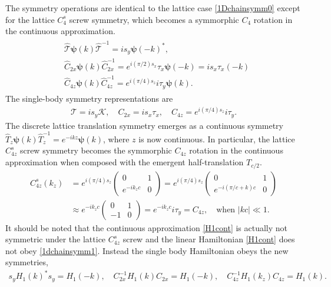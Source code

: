 The symmetry operations are identical to the lattice case \eqref{1Dchainsymm0} except for the lattice $C_4^s$ screw symmetry, which becomes a symmorphic $C_4$ rotation in the continuous approximation. \begin{align}\begin{split}&\hat{\mathcal{T}}\boldsymbol\psi(k)\hat{\mathcal{T}}^{-1}=is_y\boldsymbol\psi(-k)^\ast,\\&\hat{C}_{2x}\boldsymbol\psi(k)\hat{C}_{2x}^{-1}=e^{i(\pi/2)s_x}\tau_x\boldsymbol\psi(-k)=is_x\tau_x(-k)\\&\hat{C}_{4z}\boldsymbol\psi(k)\hat{C}_{4z}^{-1}=e^{i(\pi/4)s_z}i\tau_y\boldsymbol\psi(k).\end{split}\end{align} The single-body symmetry representations are \begin{align}\mathcal{T}=is_y\mathcal{K},\quad C_{2x}=is_x\tau_x,\quad C_{4z}=e^{i(\pi/4)s_z}i\tau_y.\end{align} The discrete lattice translation symmetry emerges as a continuous symmetry $\hat{T}_z\boldsymbol\psi(k)\hat{T}_z^{-1}=e^{-ikz}\boldsymbol\psi(k)$, where $z$ is now continuous. In particular, the lattice $C^s_{4z}$ screw symmetry becomes the symmorphic $C_{4z}$ rotation in the continuous approximation when composed with the emergent half-translation $T_{c/2}$. \begin{align}C^s_{4z}(k_z)&=e^{i(\pi/4)s_z}\begin{pmatrix}0&1\\e^{-ik_zc}&0\end{pmatrix}=e^{i(\pi/4)s_z}\begin{pmatrix}0&1\\e^{-i(\pi/c+k)c}&0\end{pmatrix}\nonumber\\&\approx e^{-ik_zc}\begin{pmatrix}0&1\\-1&0\end{pmatrix}=e^{-ik_zc}i\tau_y=C_{4z},\quad\mbox{when $|kc|\ll1$}.\end{align} It should be noted that the continuous approximation \eqref{H1cont} is actually not symmetric under the lattice $C^s_{4z}$ screw and the linear Hamiltonian \eqref{H1cont} does not obey \eqref{1dchainsymm1}. Instead the single body Hamiltonian obeys the new symmetries, \begin{align}s_yH_1(k)^\ast s_y=H_1(-k),\quad C_{2x}^{-1}H_1(k)C_{2x}=H_1(-k),\quad C_{4z}^{-1}H_1(k_z)C_{4z}=H_1(k).\end{align}






